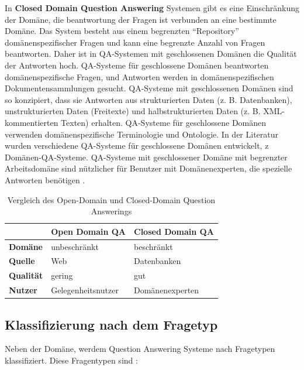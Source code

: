 \documentclass[
        ngerman,
        paper=a4,
        numbers=noendperiod,
]{scrreprt}
\begin{document}
In \textbf{Closed Domain Question Answering} Systemen gibt es eine Einschränkung der Domäne, die beantwortung der Fragen ist verbunden an eine bestimmte Domäne. Das System besteht aus einem begrenzten \enquote{Repository} domänenspezifischer Fragen und kann eine begrenzte Anzahl von Fragen beantworten. Daher ist in QA-Systemen mit geschlossenen Domänen die Qualität der Antworten hoch. QA-Systeme für geschlossene Domänen beantworten domänenspezifische Fragen, und Antworten werden in domänenspezifischen Dokumentensammlungen gesucht. QA-Systeme mit geschlossenen Domänen sind so konzipiert, dass sie Antworten aus strukturierten Daten (z. B. Datenbanken), unstrukturierten Daten (Freitexte) und halbstrukturierten Daten (z. B. XML-kommentierten Texten) erhalten. QA-Systeme für geschlossene Domänen verwenden domänenspezifische Terminologie und Ontologie. In der Literatur wurden verschiedene QA-Systeme für geschlossene Domänen entwickelt, z Domänen-QA-Systeme. QA-Systeme mit geschlossener Domäne mit begrenzter Arbeitsdomäne sind nützlicher für Benutzer mit Domänenexperten, die spezielle Antworten benötigen \citep[S. 20]{ChandraASystem}.

\begin{table}[H]
{\small
    \begin{tabularx}{\textwidth}{X|X|X} 
    
                  &\textbf{Open Domain QA}  & \textbf{Closed Domain QA}  \\ 
\hline    
    \textbf{Domäne}      & unbeschränkt        & beschränkt         \\ 
    \textbf{Quelle}   & Web        & Datenbanken          \\ 
    \textbf{Qualität} & gering        & gut           \\ 
    \textbf{Nutzer} & Gelegenheitsnutzer        & Domänenexperten           \\ 
    \end{tabularx}
\caption{Vergleich des Open-Domain und Closed-Domain Question Answerings}
    \label{tab:tab1}
}
\end{table}


\subsection{Klassifizierung nach dem Fragetyp}

Neben der Domäne, werdem Question Answering Systeme nach Fragetypen klassifiziert. Diese Fragentypen sind \citep[S. 20-21]{ChandraASystem}:
\end{document}
